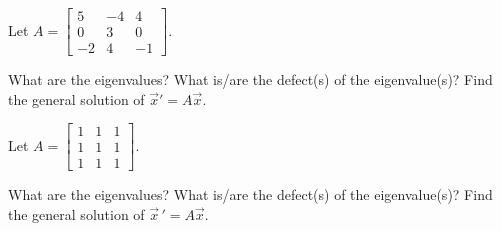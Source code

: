 \documentclass{ximera}
\begin{document}
\begin{exercise}
    Let $A = 
    \left[ 
        \begin{smallmatrix}
            5 & -4 & 4 \\
            0 & 3 & 0 \\
            -2 & 4 & -1
        \end{smallmatrix} 
    \right]$.
    \begin{tasks}
        \task What are the eigenvalues?
        \task What is/are the defect(s) of the eigenvalue(s)?
        \task Find the general solution of ${\vec{x}}' = A \vec{x}$.
    \end{tasks}
\end{exercise}

\begin{exercise}%
    Let $A =
    \left[ 
        \begin{smallmatrix}
            1 & 1 & 1 \\
            1 & 1 & 1 \\
            1 & 1 & 1 
        \end{smallmatrix}
    \right]$.  
    \begin{tasks}
        \task What are the eigenvalues?
        \task What is/are the defect(s) of the eigenvalue(s)?
        \task Find the general solution of $\vec{x}\,' = A\vec{x}$.
    \end{tasks}
\end{exercise}
\end{document}
